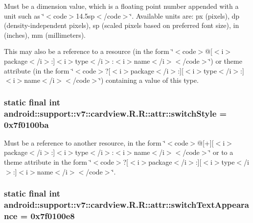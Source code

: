 Must be a dimension value, which is a floating point number appended with a unit such as \char`\"{}$<$code$>$14.5sp$<$/code$>$\char`\"{}. Available units are: px (pixels), dp (density-independent pixels), sp (scaled pixels based on preferred font size), in (inches), mm (millimeters). 

This may also be a reference to a resource (in the form \char`\"{}$<$code$>$@\mbox{[}$<$i$>$package$<$/i$>$:\mbox{]}$<$i$>$type$<$/i$>$:$<$i$>$name$<$/i$>$$<$/code$>$\char`\"{}) or theme attribute (in the form \char`\"{}$<$code$>$?\mbox{[}$<$i$>$package$<$/i$>$:\mbox{]}\mbox{[}$<$i$>$type$<$/i$>$:\mbox{]}$<$i$>$name$<$/i$>$$<$/code$>$\char`\"{}) containing a value of this type. \hypertarget{classandroid_1_1support_1_1v7_1_1cardview_1_1_r_1_1attr_cb52185fb2e6880d30f644b8a8c7c43b}{
\subsubsection[{switchStyle}]{\setlength{\rightskip}{0pt plus 5cm}static final int android::support::v7::cardview.R.R::attr::switchStyle = 0x7f0100ba}}
\label{classandroid_1_1support_1_1v7_1_1cardview_1_1_r_1_1attr_cb52185fb2e6880d30f644b8a8c7c43b}


Must be a reference to another resource, in the form \char`\"{}$<$code$>$@\mbox{[}+\mbox{]}\mbox{[}$<$i$>$package$<$/i$>$:\mbox{]}$<$i$>$type$<$/i$>$:$<$i$>$name$<$/i$>$$<$/code$>$\char`\"{} or to a theme attribute in the form \char`\"{}$<$code$>$?\mbox{[}$<$i$>$package$<$/i$>$:\mbox{]}\mbox{[}$<$i$>$type$<$/i$>$:\mbox{]}$<$i$>$name$<$/i$>$$<$/code$>$\char`\"{}. \hypertarget{classandroid_1_1support_1_1v7_1_1cardview_1_1_r_1_1attr_c42c9ad69f0f6ca69806c94e7c3e1d3e}{
\subsubsection[{switchTextAppearance}]{\setlength{\rightskip}{0pt plus 5cm}static final int android::support::v7::cardview.R.R::attr::switchTextAppearance = 0x7f0100e8}}
\label{classandroid_1_1support_1_1v7_1_1cardview_1_1_r_1_1attr_c42c9ad69f0f6ca69806c94e7c3e1d3e}


